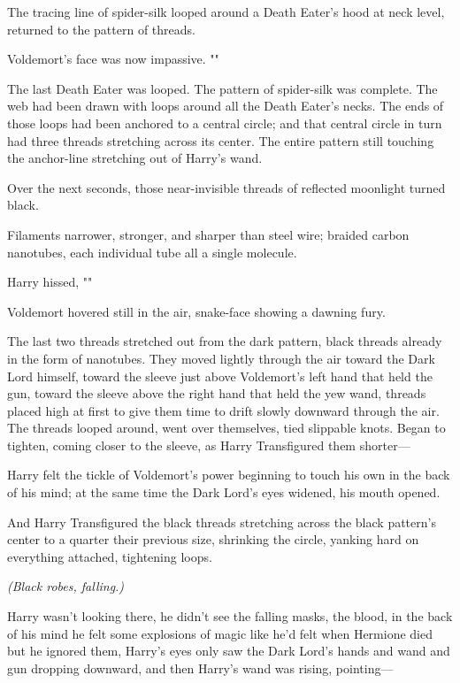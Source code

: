 The tracing line of spider-silk looped around a Death Eater's hood at neck
level, returned to the pattern of threads.

Voldemort's face was now impassive. ""

The last Death Eater was looped. The pattern of spider-silk was complete. The
web had been drawn with loops around all the Death Eater's necks. The ends of
those loops had been anchored to a central circle; and that central circle in
turn had three threads stretching across its center. The entire pattern still
touching the anchor-line stretching out of Harry's wand.

Over the next seconds, those near-invisible threads of reflected moonlight
turned black.

Filaments narrower, stronger, and sharper than steel wire; braided carbon
nanotubes, each individual tube all a single molecule.

Harry hissed, ""

Voldemort hovered still in the air, snake-face showing a dawning fury.

The last two threads stretched out from the dark pattern, black threads already
in the form of nanotubes. They moved lightly through the air toward the Dark
Lord himself, toward the sleeve just above Voldemort's left hand that held the
gun, toward the sleeve above the right hand that held the yew wand, threads
placed high at first to give them time to drift slowly downward through the
air. The threads looped around, went over themselves, tied slippable knots.
Began to tighten, coming closer to the sleeve, as Harry Transfigured them
shorter—

Harry felt the tickle of Voldemort's power beginning to touch his own in the
back of his mind; at the same time the Dark Lord's eyes widened, his mouth
opened.

And Harry Transfigured the black threads stretching across the black pattern's
center to a quarter their previous size, shrinking the circle, yanking hard on
everything attached, tightening loops.

\emph{(Black robes, falling.)}

Harry wasn't looking there, he didn't see the falling masks, the blood, in the
back of his mind he felt some explosions of magic like he'd felt when Hermione
died but he ignored them, Harry's eyes only saw the Dark Lord's hands and wand
and gun dropping downward, and then Harry's wand was rising, pointing—

